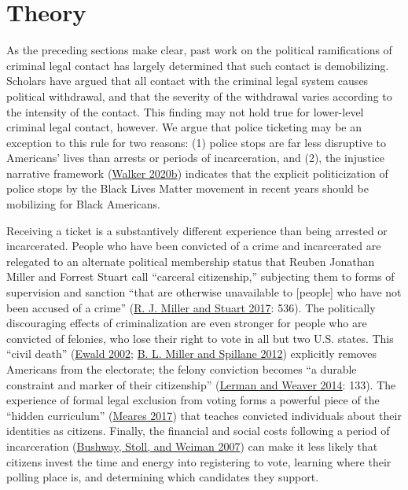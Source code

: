 \documentclass[
  12pt,
]{article}
\begin{document}
\hypertarget{theory}{%
\section*{Theory}\label{theory}}

As the preceding sections make clear, past work on the political ramifications of criminal legal contact has largely determined that such contact is demobilizing. Scholars have argued that all contact with the criminal legal system causes political withdrawal, and that the severity of the withdrawal varies according to the intensity of the contact. This finding may not hold true for lower-level criminal legal contact, however. We argue that police ticketing may be an exception to this rule for two reasons: (1) police stops are far less disruptive to Americans' lives than arrests or periods of incarceration, and (2), the injustice narrative framework (\protect\hyperlink{ref-Walker2020a}{Walker 2020b}) indicates that the explicit politicization of police stops by the Black Lives Matter movement in recent years should be mobilizing for Black Americans.

Receiving a ticket is a substantively different experience than being arrested or incarcerated. People who have been convicted of a crime and incarcerated are relegated to an alternate political membership status that Reuben Jonathan Miller and Forrest Stuart call ``carceral citizenship,'' subjecting them to forms of supervision and sanction ``that are otherwise unavailable to {[}people{]} who have not been accused of a crime'' (\protect\hyperlink{ref-Miller2017}{R. J. Miller and Stuart 2017}: 536). The politically discouraging effects of criminalization are even stronger for people who are convicted of felonies, who lose their right to vote in all but two U.S. states. This ``civil death'' (\protect\hyperlink{ref-Ewald2002}{Ewald 2002}; \protect\hyperlink{ref-Miller2012}{B. L. Miller and Spillane 2012}) explicitly removes Americans from the electorate; the felony conviction becomes ``a durable constraint and marker of their citizenship'' (\protect\hyperlink{ref-Lerman2014}{Lerman and Weaver 2014}: 133). The experience of formal legal exclusion from voting forms a powerful piece of the ``hidden curriculum'' (\protect\hyperlink{ref-Meares2017}{Meares 2017}) that teaches convicted individuals about their identities as citizens. Finally, the financial and social costs following a period of incarceration (\protect\hyperlink{ref-Bushway2007}{Bushway, Stoll, and Weiman 2007}) can make it less likely that citizens invest the time and energy into registering to vote, learning where their polling place is, and determining which candidates they support.
\end{document}
